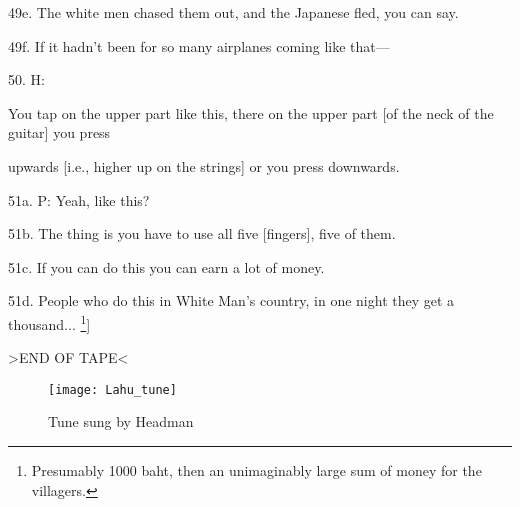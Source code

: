 49e. The white men chased them out, and the Japanese fled, you can say.

49f. If it hadn't been for so many airplanes coming like that---

50. H: 

You tap on the upper part like this, there on the upper part [of the neck of the
guitar] you press

upwards [i.e., higher up on the strings] or you press downwards.

51a. P: Yeah, like this?

51b. The thing is you have to use all five [fingers], five of them.

51c. If you can do this you can earn a lot of money.

51d. People who do this in White Man's country, in one night they get a thousand...
\footnote{Presumably 1000 baht, then an unimaginably large sum of money for the villagers.}]

>END OF TAPE<

\begin{figure}
\texttt{[image: Lahu\_tune]}\centering
\caption{Tune sung by Headman}
\label{fig:score1}
\end{figure}

